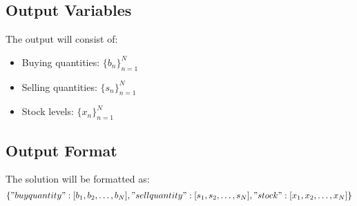 \documentclass{article}
\begin{document}
\subsection*{Output Variables}
The output will consist of:
\begin{itemize}
    \item Buying quantities: \( \{ b_n \}_{n=1}^N \)
    \item Selling quantities: \( \{ s_n \}_{n=1}^N \)
    \item Stock levels: \( \{ x_n \}_{n=1}^N \)
\end{itemize}

\subsection*{Output Format}
The solution will be formatted as:
\[
\{
    "buyquantity": [b_1, b_2, \ldots, b_N],
    "sellquantity": [s_1, s_2, \ldots, s_N],
    "stock": [x_1, x_2, \ldots, x_N]
\}
\]
\end{document}
